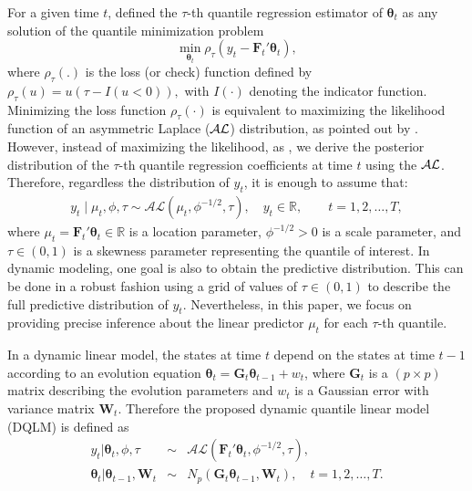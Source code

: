 \documentclass[12pt,a4paper]{article}\usepackage[]{graphicx}\usepackage[]{color}\usepackage{subfigure}
\newcommand{\bfFt}{\mathbf{F}_t}
\newcommand{\bfGt}{\mathbf{G}_t}
\newcommand{\bfWt}{\mathbf{W}_t}
\newcommand{\bftheta}{\boldsymbol{\theta}}
\begin{document}
For a given time $t$, \cite{Koenker1978} defined the $\tau$-th quantile regression estimator of $\bftheta_t$ as any solution of the quantile minimization problem
\begin{equation*}%
\min_{\bftheta_t}\rho_\tau\left(y_t-\bfFt' \bftheta_t \right),
\end{equation*}
where $\rho_\tau(.)$ is the loss (or check) function defined by $\rho_\tau(u) = u( \tau - I(u<0)),$ with $I(\cdot)$ denoting the indicator function.
Minimizing the loss function $\rho_\tau(\cdot)$ is equivalent to maximizing the likelihood function of an asymmetric Laplace ($\cal{AL}$) distribution, as pointed out by \cite{yu2001bayesian}. 
However, instead of maximizing the likelihood, as \cite{yu2001bayesian}, we derive the posterior distribution of the $\tau$-th quantile regression coefficients at time $t$ using the $\cal{AL}$. 
Therefore, regardless the distribution of $y_t$, it is enough  to assume that:
\begin{align}
y_t \mid \mu_t, \phi, \tau \sim \mathcal{AL}\left( \mu_t, \phi^{-1/2}, \tau \right), \quad y_t \in \mathbb{R}, \qquad t=1,2,\ldots,T, 
\end{align}
where $\mu_t = {\bfFt'} \bftheta_t \in \mathbb{R}$ is a location parameter, $\phi^{-1/2}>0$ is a scale parameter, and $\tau \in (0,1)$ is a skewness 
parameter representing the quantile of interest. 
In dynamic  modeling, one goal is also to obtain the predictive distribution. 
This can be done in a robust fashion using a grid of values of $\tau \in (0,1)$ to describe the full predictive distribution of $y_t$. %
Nevertheless, in this paper, we focus on providing precise inference about the linear predictor $\mu_t$ for each $\tau$-th quantile.

In a dynamic linear model, the states at time $t$ depend on the states at time $t-1$ according to an evolution equation $\bftheta_t = \bfGt \bftheta_{t-1} + w_t$, 
where $\bfGt$ is a $(p \times p)$ matrix describing the evolution parameters and $w_t$ is a Gaussian error with variance matrix $\mathbf{W}_t$.  
Therefore the proposed dynamic quantile linear model (DQLM) is defined as
\begin{eqnarray}  \nonumber
y_t | \bftheta_t, \phi, \tau & \sim & \mathcal{AL}\left( \bfFt' \bftheta_t, \phi^{-1/2}, \tau \right), \\ \label{DQLM}
\bftheta_t |\bftheta_{t-1},  \bfWt & \sim & N_p(\bfGt \bftheta_{t-1}, \bfWt), \quad t=1,2,\ldots,T.
\end{eqnarray}
\end{document}
